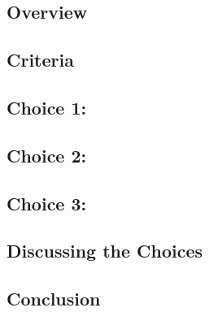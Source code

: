 \documentclass[draftclsnofoot, onecolumn, 10pt, compsoc]{IEEEtran}
\begin{document}
		\subsection{Overview}
		\subsection{Criteria}
		\subsection{Choice 1: }
		\subsection{Choice 2: }
		\subsection{Choice 3: }
		\subsection{Discussing the Choices}
		\subsection{Conclusion}
		
	
	
	
\end{document}
